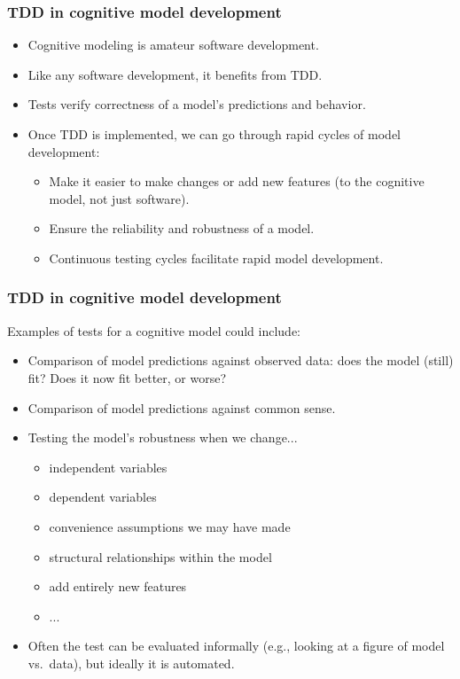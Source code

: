 \documentclass{beamer}
\renewcommand{\emph}[1]{{\color{red}#1}}
\begin{document}
\begin{frame}
\frametitle{TDD in cognitive model development}
\begin{itemize}
\item Cognitive modeling is amateur software development.
\item Like any software development, it benefits from TDD.
\item Tests verify correctness of a model's predictions and behavior.
\item Once TDD is implemented, we can go through rapid cycles of model development:
\begin{itemize}
\item Make it easier to make changes or add new features (to the \emph{cognitive model}, not just software).
\item Ensure the reliability and robustness of a model.
\item Continuous testing cycles facilitate rapid model development.
\end{itemize}
\end{itemize}
\end{frame}

\begin{frame}
\frametitle{TDD in cognitive model development}
Examples of tests for a cognitive model could include: 
     \begin{itemize}
     \item Comparison of model predictions against observed data: does the model (still) fit?  Does it now fit better, or worse?
     \item Comparison of model predictions against common sense.
     \item Testing the model's robustness when we change...
     \begin{itemize}
     \item independent variables
     \item dependent variables
     \item convenience assumptions we may have made
     \item structural relationships within the model
     \item add entirely new features
     \item ...
     \end{itemize}
     \item Often the test can be evaluated informally (e.g., looking at a figure of model vs.\ data), but ideally it is automated.
  \end{itemize}

\end{frame}
\end{document}
